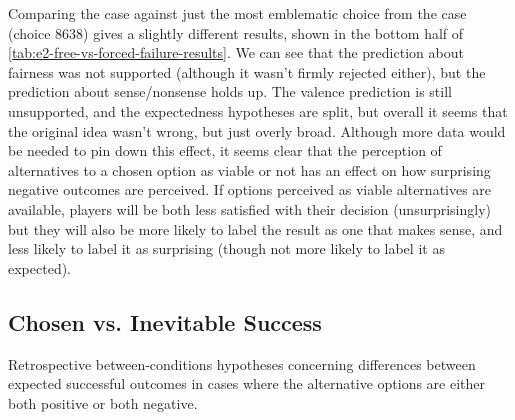 Comparing the \unxf{} case against just the most emblematic choice from the \obvfm{} case (choice 8638) gives a slightly different results, shown in the bottom half of \cref{tab:e2-free-vs-forced-failure-results}.
%
We can see that the prediction about fairness was not supported (although it wasn't firmly rejected either), but the prediction about sense/nonsense holds up.
%
The valence prediction is still unsupported, and the expectedness hypotheses are split, but overall it seems that the original idea wasn't wrong, but just overly broad.
%
Although more data would be needed to pin down this effect, it seems clear that the perception of alternatives to a chosen option as viable or not has an effect on how surprising negative outcomes are perceived.
%
If options perceived as viable alternatives are available, players will be both less satisfied with their decision (unsurprisingly) but they will also be more likely to label the result as one that makes sense, and less likely to label it as surprising (though not more likely to label it as expected).


\subsection{Chosen vs\@. Inevitable Success}

\begin{table}[!p]
\centering
\bgroup
\def\arraystretch{1.3}
\setlength{\tabcolsep}{0.6em}

\egroup
\caption[Retrospective chosen vs\@. inevitable success results]{Retrospective between-conditions hypotheses concerning differences between expected successful outcomes in cases where the alternative options are either both positive or both negative.}
  \label{tab:e2-chosen-vs-inevitable-success-results}
\end{table}

